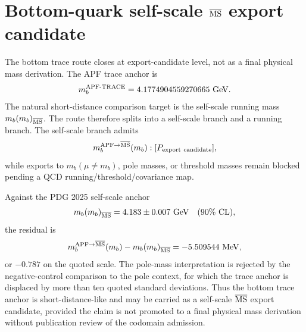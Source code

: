 
\section{Bottom-quark self-scale \texorpdfstring{$\overline{\rm MS}$}{MSbar} export candidate}

The bottom trace route closes at export-candidate level, not as a final physical
mass derivation.  The APF trace anchor is
\[
  m_b^{\rm APF\text{-}TRACE}=4.1774904559270665\ {\rm GeV}.
\]
The natural short-distance comparison target is the self-scale running mass
\(m_b(m_b)_{\overline{\rm MS}}\).  The route therefore splits into a self-scale
branch and a running branch.  The self-scale branch admits
\[
  m_b^{\rm APF\to \overline{MS}}(m_b):[P_{\rm export\ candidate}],
\]
while exports to \(m_b(\mu\ne m_b)\), pole masses, or threshold masses remain
blocked pending a QCD running/threshold/covariance map.

Against the PDG 2025 self-scale anchor
\[
  m_b(m_b)_{\overline{\rm MS}} = 4.183\pm0.007\ {\rm GeV}\quad(90\%\ {\rm CL}),
\]
the residual is
\[
  m_b^{\rm APF\to \overline{MS}}(m_b)-m_b(m_b)_{\overline{\rm MS}}
  = -5.509544\ {\rm MeV},
\]
or \(-0.787\) on the quoted scale.  The pole-mass interpretation is rejected by
the negative-control comparison to the pole context, for which the trace anchor
is displaced by more than ten quoted standard deviations.  Thus the bottom trace
anchor is short-distance-like and may be carried as a self-scale
\(\overline{\rm MS}\) export candidate, provided the claim is not promoted to a
final physical mass derivation without publication review of the codomain
admission.
